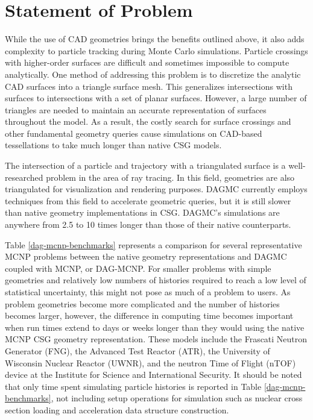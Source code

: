 \section{Statement of Problem}\label{sec:problem-statement}

While the use of CAD geometries brings the benefits outlined above, it also adds
complexity to particle tracking during Monte Carlo simulations. Particle
crossings with higher-order surfaces are difficult and sometimes impossible to
compute analytically. One method of addressing this problem is to discretize the
analytic CAD surfaces into a triangle surface mesh. This generalizes
intersections with surfaces to intersections with a set of planar
surfaces. However, a large number of triangles are needed to maintain an
accurate representation of surfaces throughout the model. As a result, the
costly search for surface crossings and other fundamental geometry
queries cause simulations on CAD-based tessellations
to take much longer than native CSG models.

The intersection of a particle and trajectory with a triangulated surface is a
well-researched problem in the area of ray tracing. In this field, geometries
are also triangulated for visualization and rendering purposes. DAGMC currently
employs techniques from this field to accelerate geometric queries, but it is
still slower than native geometry implementations in CSG. DAGMC's simulations
are anywhere from 2.5 to 10 times longer than those of their native
counterparts.

Table \ref{dag-mcnp-benchmarks} represents a comparison for several
representative MCNP problems between the native geometry representations and
DAGMC coupled with MCNP, or DAG-MCNP. For smaller problems with simple
geometries and relatively low numbers of histories required to reach a low level
of statistical uncertainty, this might not pose as much of a problem to
users. As problem geometries become more complicated and the number of histories
becomes larger, however, the difference in computing time becomes important when
run times extend to days or weeks longer than they would using the native MCNP
CSG geometry representation. These models include the Frascati Neutron Generator
(FNG), the Advanced Test Reactor (ATR), the University of Wisconsin Nuclear
Reactor (UWNR), and the neutron Time of Flight (nTOF) device at the Institute
for Science and International Security. It should be noted that only time spent
simulating particle histories is reported in Table \ref{dag-mcnp-benchmarks},
not including setup operations for simulation such as nuclear cross section
loading and acceleration data structure construction.

